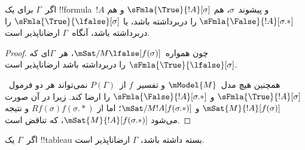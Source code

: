 \documentclass[../../../include/open-logic-section]{subfiles}
\begin{document}
\begin{prop}
  اگر~$\Gamma$ برای یک !!{formula}~$!A$ و پیشوند~$\sigma$، هم
  $\sFmla{\True}{!A}[\sigma]$ و هم
  $\sFmla{\False}{!A}[\sigma.{*}]$ را دربرداشته باشد، یا
  $\sFmla{\True}{\lfalse}[\sigma]$ را دربرداشته باشد، آنگاه~$\Gamma$
  ارضاناپذیر است.
\end{prop}

\begin{proof}
  چون همواره~$\mSat/{M}{\lfalse}[f(\sigma)]$، هر~$\Gamma$ای که
  $\sFmla{\True}{\lfalse}[\sigma]$ را دربرداشته باشد ارضاناپذیر است.

  همچنین هیچ مدل~$\mModel{M}$ و تفسیر~$f$ از~$P(\Gamma)$ نمی‌تواند هر
  دو فرمول~$\sFmla{\True}{!A}[\sigma]$ و
  $\sFmla{\False}{!A}[\sigma.{*}]$ را ارضا کند. زیرا در آن صورت
  $\mSat{M}{!A}[f(\sigma)]$ و
  $\mSat/{M}{!A}[f(\sigma.{*})]$؛ اما از
  $Rf(\sigma)f(\sigma.{*})$ و
   نتیجه می‌شود
  $\mSat{M}{!A}[f(\sigma.{*})]$، که تناقض است.
\end{proof}

\begin{thm}[درستی]
  اگر~$\Gamma$ یک !!{tableau} بسته داشته باشد، $\Gamma$ ارضاناپذیر است.
\end{thm}
\end{document}
